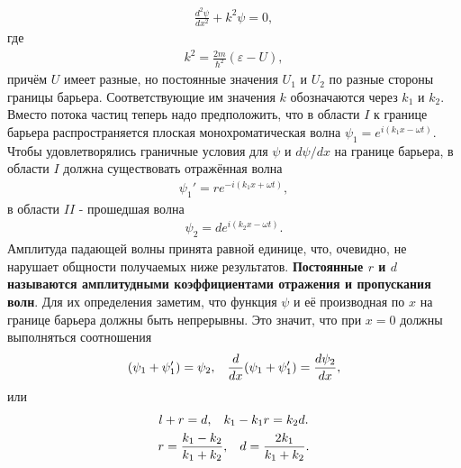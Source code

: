 \documentclass[__main__.tex]{subfiles}
\begin{document}
\begin{gather}
    \frac{d^2\psi}{dx^2} + k^2\psi = 0,
\end{gather}
где
\begin{gather}
    k^2 = \frac{2m}{\hbar^2}(\mathcal{\varepsilon} - U),
\end{gather}
причём $U$ имеет разные, но постоянные значения $U_1$ и $U_2$ по разные стороны границы барьера. Соответствующие им значения $k$ обозначаются через $k_1$ и $k_2$.\\
Вместо потока частиц теперь надо предположить, что в области $I$ к границе барьера распространяется плоская монохроматическая волна $\psi_1 = e^{i(k_1x-\omega t)}$.\\
Чтобы удовлетворялись граничные условия для $\psi$ и $d\psi/dx$ на границе барьера, в области $I$ должна существовать отражённая волна
\begin{gather*}
    \psi_1' = re^{-i(k_1x+\omega t)},
\end{gather*}
в области $II$ - прошедшая волна    \begin{gather*}
    \psi_2 = de^{i(k_2x - \omega t)}.
\end{gather*}
Амплитуда падающей волны принята равной единице, что, очевидно, не нарушает общности получаемых ниже результатов. \textbf{Постоянные $r$ и $d$ называются амплитудными коэффициентами отражения и пропускания волн}. Для их определения заметим, что функция $\psi$ и её производная по $x$ на границе барьера должны быть непрерывны. Это значит, что при $x = 0$ должны выполняться соотношения
\begin{gather*}
    (\psi_1 + \psi_1') = \psi_2, \hspace{3mm} \frac{d}{dx}(\psi_1 + \psi_1') = \frac{d\psi_2}{dx},
\end{gather*}
или
\begin{gather*}
    l + r = d, \hspace{3mm} k_1 - k_1r = k_2d.\\
    r = \frac{k_1-k_2}{k_1 + k_2}, \hspace{3mm} d = \frac{2k_1}{k_1 + k_2}.
\end{gather*}
\end{document}
